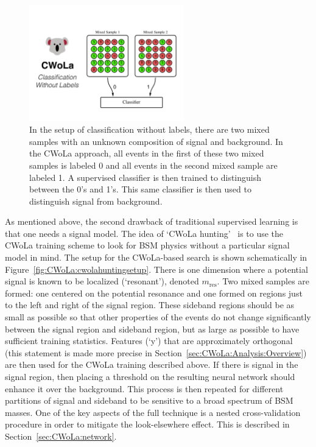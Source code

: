 \begin{figure}
\centering
\includegraphics[width=0.6\textwidth]{figures_CWoLa/cwola.pdf}
\caption{In the setup of classification without labels, there are two mixed samples with an unknown composition of signal and background.  In the CWoLa approach, all events in the first of these two mixed samples is labeled 0 and all events in the second mixed sample are labeled 1.  A supervised classifier is then trained to distinguish between the 0's and 1's.  This same classifier is then used to distinguish signal from background.}
\label{fig:CWoLa:cwolasetup}
\end{figure}

As mentioned above, the second drawback of traditional supervised learning is that one needs a signal model.  The idea of `CWoLa hunting'~\cite{Collins:2018epr,Collins:2019jip} is to use the CWoLa training scheme to look for BSM physics without a particular signal model in mind.  The setup for the CWoLa-based search is shown schematically in Figure~\ref{fig:CWoLa:cwolahuntingsetup}.  There is one dimension where a potential signal is known to be localized (`resonant'), denoted $m_\text{res}$.  Two mixed samples are formed: one centered on the potential resonance and one formed on regions just to the left and right of the signal region.  These sideband regions should be as small as possible so that other properties of the events do not change significantly between the signal region and sideband region, but as large as possible to have sufficient training statistics.  Features (`y') that are approximately orthogonal (this statement is made more precise in Section~\ref{sec:CWoLa:Analysis:Overview}) are then used for the CWoLa training described above.  If there is signal in the signal region, then placing a threshold on the resulting neural network should enhance it over the background.  This process is then repeated for different partitions of signal and sideband to be sensitive to a broad spectrum of BSM masses.  One of the key aspects of the full technique is a nested cross-validation procedure in order to mitigate the look-elsewhere effect.  This is described in Section~\ref{sec:CWoLa:network}.

